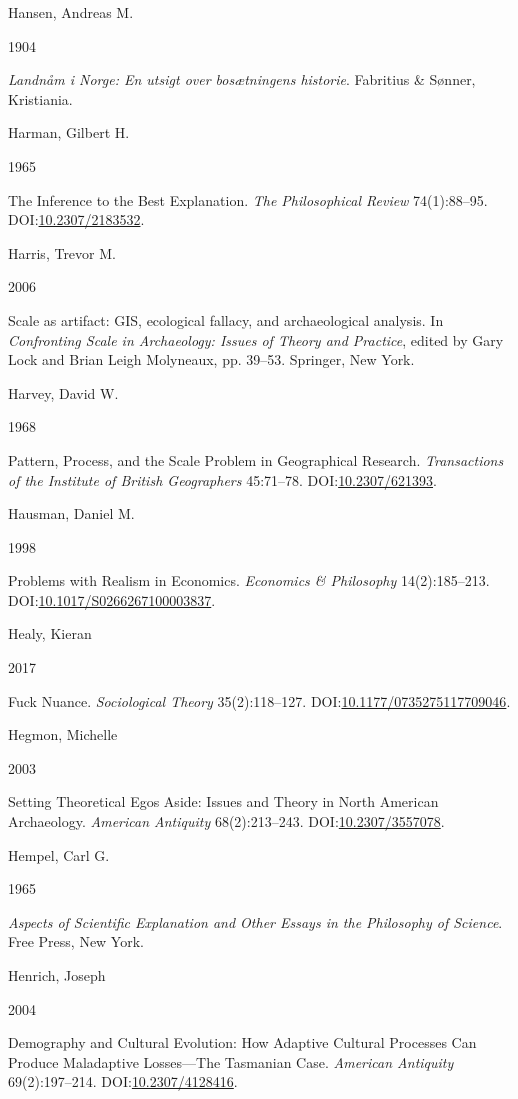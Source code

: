 \documentclass[
  12pt,
  a4paper,
  oneside]{book}
\newlength{\cslhangindent}
\newlength{\csllabelwidth}
\newlength{\cslentryspacingunit} %
\newenvironment{CSLReferences}[2] %
 {%
  \setlength{\parindent}{0pt}
  \ifodd #1
  \let\oldpar\par
  \def\par{\hangindent=\cslhangindent\oldpar}
  \fi
  \setlength{\parskip}{#2\cslentryspacingunit}
 }%
 {}
\newcommand{\CSLBlock}[1]{#1\hfill\break}
\newcommand{\CSLLeftMargin}[1]{\parbox[t]{\csllabelwidth}{#1}}
\newcommand{\CSLRightInline}[1]{\parbox[t]{\linewidth - \csllabelwidth}{#1}\break}
\begin{document}
\begin{CSLReferences}{0}{0}
\leavevmode{}%
\CSLBlock{Hansen, Andreas M.}
\CSLLeftMargin{ 1904}
\CSLRightInline{\emph{{Landnåm i Norge: En utsigt over bosætningens historie}}. Fabritius \& Sønner, Kristiania.}

\leavevmode{}%
\CSLBlock{Harman, Gilbert H.}
\CSLLeftMargin{ 1965}
\CSLRightInline{{The Inference to the Best Explanation}. \emph{The Philosophical Review} 74(1):88--95. DOI:\href{https://doi.org/10.2307/2183532}{10.2307/2183532}.}

\leavevmode{}%
\CSLBlock{Harris, Trevor M.}
\CSLLeftMargin{ 2006}
\CSLRightInline{Scale as artifact: GIS, ecological fallacy, and archaeological analysis. In \emph{{Confronting Scale in Archaeology: Issues of Theory and Practice}}, edited by Gary Lock and Brian Leigh Molyneaux, pp. 39--53. Springer, New York.}

\leavevmode{}%
\CSLBlock{Harvey, David W.}
\CSLLeftMargin{ 1968}
\CSLRightInline{{Pattern, Process, and the Scale Problem in Geographical Research}. \emph{Transactions of the Institute of British Geographers} 45:71--78. DOI:\href{https://doi.org/10.2307/621393}{10.2307/621393}.}

\leavevmode{}%
\CSLBlock{Hausman, Daniel M.}
\CSLLeftMargin{ 1998}
\CSLRightInline{{Problems with Realism in Economics}. \emph{Economics \& Philosophy} 14(2):185--213. DOI:\href{https://doi.org/10.1017/S0266267100003837}{10.1017/S0266267100003837}.}

\leavevmode{}%
\CSLBlock{Healy, Kieran}
\CSLLeftMargin{ 2017}
\CSLRightInline{Fuck Nuance. \emph{Sociological Theory} 35(2):118--127. DOI:\href{https://doi.org/10.1177/0735275117709046}{10.1177/0735275117709046}.}

\leavevmode{}%
\CSLBlock{Hegmon, Michelle}
\CSLLeftMargin{ 2003}
\CSLRightInline{{Setting Theoretical Egos Aside: Issues and Theory in North American Archaeology}. \emph{American Antiquity} 68(2):213--243. DOI:\href{https://doi.org/10.2307/3557078}{10.2307/3557078}.}

\leavevmode{}%
\CSLBlock{Hempel, Carl G.}
\CSLLeftMargin{ 1965}
\CSLRightInline{\emph{{Aspects of Scientific Explanation and Other Essays in the Philosophy of Science}}. Free Press, New York.}

\leavevmode{}%
\CSLBlock{Henrich, Joseph}
\CSLLeftMargin{ 2004}
\CSLRightInline{{Demography and Cultural Evolution: How Adaptive Cultural Processes Can Produce Maladaptive Losses---The Tasmanian Case}. \emph{American Antiquity} 69(2):197--214. DOI:\href{https://doi.org/10.2307/4128416}{10.2307/4128416}.}


\end{CSLReferences}
\end{document}
